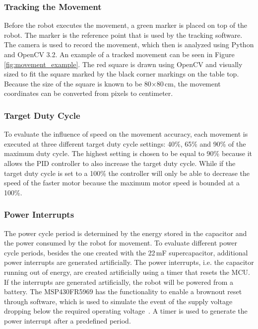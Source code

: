\subsubsection{Tracking the Movement}

Before the robot executes the movement, a green marker is placed on top of the robot.
The marker is the reference point that is used by the tracking software.
The camera is used to record the movement, which then is analyzed using Python and OpenCV 3.2.
An example of a tracked movement can be seen in Figure \ref{fig:movement_example}.
The red square is drawn using OpenCV and visually sized to fit the square marked by the black corner markings on the table top.
Because the size of the square is known to be 80$\times$80\,cm, the movement coordinates can be converted from pixels to centimeter.

\subsubsection{Target Duty Cycle}
To evaluate the influence of speed on the movement accuracy, each movement is executed at three different target duty cycle settings: 40\%, 65\% and 90\% of the maximum duty cycle.
The highest setting is chosen to be equal to 90\% because it allows the PID controller to also increase the target duty cycle.
While if the target duty cycle is set to a 100\% the controller will only be able to decrease the speed of the faster motor because the maximum motor speed is bounded at a 100\%.


\subsubsection{Power Interrupts}

The power cycle period is determined by the energy stored in the capacitor and the power consumed by the robot for movement.
To evaluate different power cycle periods, besides the one created with the 22\,mF supercapacitor, additional power interrupts are generated artificially.
The power interrupts, i.e. the capacitor running out of energy, are created artificially using a timer that resets the MCU.
If the interrupts are generated artificially, the robot will be powered from a battery.
The MSP430FR5969 has the functionality to enable a brownout reset through software, which is used to simulate the event of the supply voltage dropping below the required operating voltage~\cite{msp430fr_family_guide_2017}.
A timer is used to generate the power interrupt after a predefined period.


